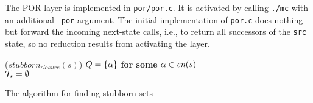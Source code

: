 \documentclass[12pt]{article}
\begin{document}
\begin{center}
\end{center}


The POR layer is implemented in \texttt{por/por.c}.
It is activated by calling \texttt{./mc} with an
additional \texttt{--por} argument.
The initial implementation of \texttt{por.c}
does nothing but forward the incoming next-state calls,
i.e., to return all successors of the \texttt{src} state,
so no reduction results from activating the layer.


\begin{algorithm}[b]
\Function({$\mathit{stubborn}_{\mathit{closure}}(s)$}) {
$Q = \{{\alpha} \}$ \textbf{for some} ${\alpha} \in \mathit{en}(s)$\\\label{l:nondet1}
$\mathcal{T}_s = \emptyset$\\
}
\caption{The  algorithm for finding stubborn sets}
\label{alg:stubborn-set}
\end{algorithm}
\end{document}

